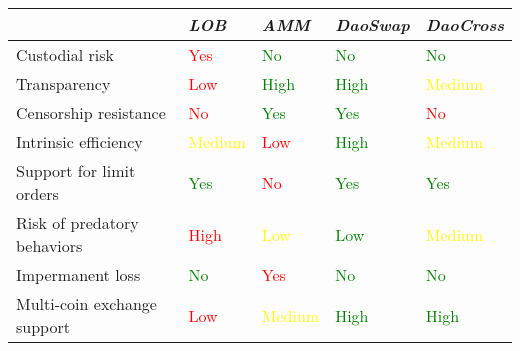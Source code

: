 \documentclass[11pt, reqno]{amsart}
\theoremstyle{definition}
\theoremstyle{remark}
\begin{document}
\begin{samepage}
	\begin{table}[h!]
		\centering
		\begin{tabular}{lllll}
			                            & \emph{LOB} & \emph{AMM} & \emph{DaoSwap} & \emph{DaoCross} \\
			\hline
            Custodial risk              & \textcolor{red}{Yes}        & \textcolor{green}{No} & \textcolor{green}{No} & \textcolor{green}{No}  \\
            Transparency                & \textcolor{red}{Low}        & \textcolor{green}{High}       & \textcolor{green}{High}           & \textcolor{yellow}{Medium} \\
            Censorship resistance       & \textcolor{red}{No}         & \textcolor{green}{Yes} & \textcolor{green}{Yes} & \textcolor{red}{No} \\
            Intrinsic efficiency        & \textcolor{yellow}{Medium}     & \textcolor{red}{Low}        & \textcolor{green}{High} & \textcolor{yellow}{Medium}          \\
            Support for limit orders    & \textcolor{green}{Yes} & \textcolor{red}{No} & \textcolor{green}{Yes}            & \textcolor{green}{Yes} \\
            Risk of predatory behaviors & \textcolor{red}{High} & \textcolor{yellow}{Low} & \textcolor{green}{Low}       & \textcolor{yellow}{Medium} \\
            Impermanent loss            & \textcolor{green}{No}         & \textcolor{red}{Yes} & \textcolor{green}{No}             & \textcolor{green}{No}              \\
            Multi-coin exchange support & \textcolor{red}{Low} & \textcolor{yellow}{Medium} & \textcolor{green}{High} & \textcolor{green}{High} \\
			\hline
		\end{tabular}
	\end{table}
\end{samepage}

\end{document}
